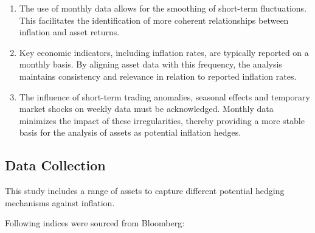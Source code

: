 \documentclass[
]{article}
\providecommand{\tightlist}{%
  \setlength{\itemsep}{0pt}\setlength{\parskip}{0pt}}
\begin{document}
\begin{enumerate}
\def\labelenumi{\arabic{enumi}.}
\tightlist
\item
  The use of monthly data allows for the smoothing of short-term
  fluctuations. This facilitates the identification of more coherent
  relationships between inflation and asset returns.
\item
  Key economic indicators, including inflation rates, are typically
  reported on a monthly basis. By aligning asset data with this
  frequency, the analysis maintains consistency and relevance in
  relation to reported inflation rates.
\item
  The influence of short-term trading anomalies, seasonal effects and
  temporary market shocks on weekly data must be acknowledged. Monthly
  data minimizes the impact of these irregularities, thereby providing a
  more stable basis for the analysis of assets as potential inflation
  hedges.
\end{enumerate}

\subsection{Data Collection}\label{data-collection}

This study includes a range of assets to capture different potential
hedging mechanisms against inflation.

Following indices were sourced from Bloomberg:
\end{document}
